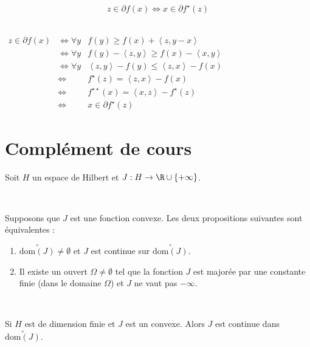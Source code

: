 \documentclass[12pt,a4paper]{article}
\begin{document}
	\begin{prop}[conjugaison]$ $\\
		\[z\in \partial f(x) \iff x \in \partial f^\star(z) \]
	\end{prop}
	\begin{dem}
		$ $\\
		$\begin{aligned}
			z \in \partial f(x) & \iff \forall y & f(y) \geq f(x) +\left<z,y-x\right>\\
			&\iff \forall y & f(y)-\left<z,y\right> \geq f(x) -\left<x,y\right>\\
			&\iff \forall y&  \left<z,y\right> -f(y) \leq \left<z,x\right>-f(x) \\
			&\iff& f^\star(z) =  \left<z,x\right>-f(x) \\
			&\iff& f^{\star\star}(x) = \left<x,z\right>-f^\star(z)\\
			&\iff& x \in \partial f^\star(z)
		\end{aligned}$
	\end{dem}
	
	\section{Complément de cours}
	
	Soit $H$ un espace de Hilbert et $J : H \to \R \cup\{+\infty\}$.
	
	\begin{thm}
		$ $\\
		\begin{minipage}{17cm}
			Supposons que $J$ est une fonction convexe. Les deux propositions suivantes sont équivalentes :
			\begin{enumerate}
				\item $\overset{\circ}{\mathrm{dom}(J)} \not = \emptyset$ et $J$ est continue sur $\overset{\circ}{\mathrm{dom}(J)}$.
				\item Il existe un ouvert $\Omega \not= \emptyset$ tel que la fonction $J$ est majorée par une constante finie (dans le domaine $\Omega$) et $J$ ne vaut pas $-\infty$.
			\end{enumerate}
		\end{minipage}
	\end{thm}
	
	\begin{cor}
		$ $\\
		\begin{minipage}{17cm}
			Si $H$ est de dimension finie et $J$ est un convexe. Alors $J$ est continue dans $\overset{\circ}{\mathrm{dom}(J)}$.
		\end{minipage}
	\end{cor}
	
\end{document}
